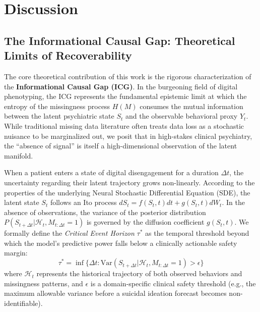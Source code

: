 \section{Discussion} \label{sec:discussion}

\subsection{The Informational Causal Gap: Theoretical Limits of Recoverability}
The core theoretical contribution of this work is the rigorous characterization of the \textbf{Informational Causal Gap (ICG)}. In the burgeoning field of digital phenotyping, the ICG represents the fundamental epistemic limit at which the entropy of the missingness process $H(M)$ consumes the mutual information between the latent psychiatric state $S_t$ and the observable behavioral proxy $Y_t$. While traditional missing data literature often treats data loss as a stochastic nuisance to be marginalized out, we posit that in high-stakes clinical psychiatry, the ``absence of signal'' is itself a high-dimensional observation of the latent manifold.

When a patient enters a state of digital disengagement for a duration $\Delta t$, the uncertainty regarding their latent trajectory grows non-linearly. According to the properties of the underlying Neural Stochastic Differential Equation (SDE), the latent state $S_t$ follows an Ito process $dS_t = f(S_t, t)dt + g(S_t, t)dW_t$. In the absence of observations, the variance of the posterior distribution $P(S_{t+\Delta t} | \mathcal{H}_t, M_{t:\Delta t}=1)$ is governed by the diffusion coefficient $g(S_t, t)$. We formally define the \textit{Critical Event Horizon} $\tau^*$ as the temporal threshold beyond which the model's predictive power falls below a clinically actionable safety margin:
\begin{equation}
    \tau^* = \inf \{ \Delta t : \text{Var}(S_{t+\Delta t} | \mathcal{H}_t, M_{t:\Delta t}=1) > \epsilon \}
\end{equation}
where $\mathcal{H}_t$ represents the historical trajectory of both observed behaviors and missingness patterns, and $\epsilon$ is a domain-specific clinical safety threshold (e.g., the maximum allowable variance before a suicidal ideation forecast becomes non-identifiable).

